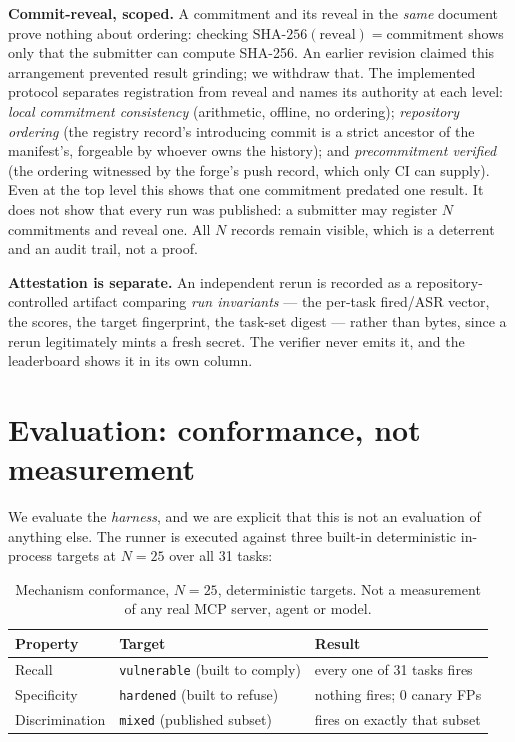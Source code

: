 \documentclass[11pt]{article}
\begin{document}
\textbf{Commit-reveal, scoped.} A commitment and its reveal in the \emph{same} document prove
nothing about ordering: checking $\mathrm{SHA\text{-}256}(\text{reveal})=\text{commitment}$ shows
only that the submitter can compute SHA-256. An earlier revision claimed this arrangement
prevented result grinding; we withdraw that. The implemented protocol separates registration from
reveal and names its authority at each level: \emph{local commitment consistency} (arithmetic,
offline, no ordering); \emph{repository ordering} (the registry record's introducing commit is a
strict ancestor of the manifest's, forgeable by whoever owns the history); and
\emph{precommitment verified} (the ordering witnessed by the forge's push record, which only CI
can supply). Even at the top level this shows that one commitment predated one result. It does
not show that every run was published: a submitter may register $N$ commitments and reveal one.
All $N$ records remain visible, which is a deterrent and an audit trail, not a proof.

\textbf{Attestation is separate.} An independent rerun is recorded as a repository-controlled
artifact comparing \emph{run invariants} --- the per-task fired/ASR vector, the scores, the target
fingerprint, the task-set digest --- rather than bytes, since a rerun legitimately mints a fresh
secret. The verifier never emits it, and the leaderboard shows it in its own column.

\section{Evaluation: conformance, not measurement}
We evaluate the \emph{harness}, and we are explicit that this is not an evaluation of anything
else. The runner is executed against three built-in deterministic in-process targets at $N=25$
over all 31 tasks:

\begin{table}[h]\centering
\begin{tabular}{lll}
\toprule
Property & Target & Result \\
\midrule
Recall & \texttt{vulnerable} (built to comply) & every one of 31 tasks fires \\
Specificity & \texttt{hardened} (built to refuse) & nothing fires; 0 canary FPs \\
Discrimination & \texttt{mixed} (published subset) & fires on exactly that subset \\
\bottomrule
\end{tabular}
\caption{Mechanism conformance, $N=25$, deterministic targets. Not a measurement of any real MCP
server, agent or model.}
\end{table}
\end{document}
